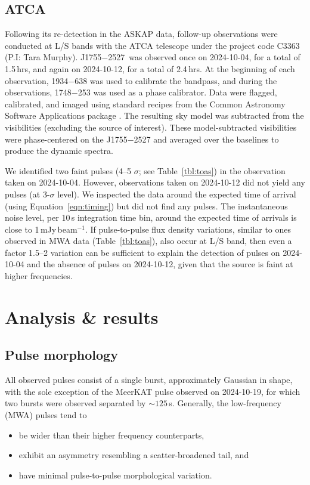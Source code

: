 \documentclass[fleqn,usenatbib]{mnras}
\newcommand{\src}{J1755$-$2527}
\begin{document}
\subsection{ATCA}

Following its re-detection in the ASKAP data, follow-up observations were conducted at L/S bands with the ATCA telescope under the project code C3363 (P.I: Tara Murphy). \src\ was observed once on 2024-10-04, for a total of 1.5\,hrs, and again on 2024-10-12, for a total of 2.4\,hrs. At the beginning of each observation, 1934$-$638 was used to calibrate the bandpass, and during the observations, 1748$-$253 was used as a phase calibrator. Data were flagged, calibrated, and imaged using standard recipes from the Common Astronomy Software Applications package \citep[CASA;][]{casa}. The resulting sky model was subtracted from the visibilities (excluding the source of interest). These model-subtracted visibilities were phase-centered on the \src{} and averaged over the baselines to produce the dynamic spectra. 

We identified two faint pulses (4--5 $\sigma$; see Table~\ref{tbl:toas}) in the observation taken on 2024-10-04. However, observations taken on 2024-10-12 did not yield any pulses (at 3-$\sigma$ level). We inspected the data around the expected time of arrival (using Equation~\ref{eqn:timing}) but did not find any pulses. The instantaneous noise level, per 10\,s integration time bin, around the expected time of arrivals is close to 1\,mJy\,beam$^{-1}$. If pulse-to-pulse flux density variations, similar to ones observed in MWA data (Table~\ref{tbl:toas}), also occur at L/S band, then even a factor 1.5--2 variation can be sufficient to explain the detection of pulses on 2024-10-04 and the absence of pulses on 2024-10-12, given that the source is faint at higher frequencies. 

\section{Analysis \& results} \label{sec:analysis}

\subsection{Pulse morphology}

All observed pulses consist of a single burst, approximately Gaussian in shape, with the sole exception of the MeerKAT pulse observed on 2024-10-19, for which two bursts were observed separated by ${\sim}125\,$s.
Generally, the low-frequency (MWA) pulses tend to
\begin{itemize}
    \item be wider than their higher frequency counterparts,
    \item exhibit an asymmetry resembling a scatter-broadened tail, and
    \item have minimal pulse-to-pulse morphological variation.
\end{itemize}
\end{document}
